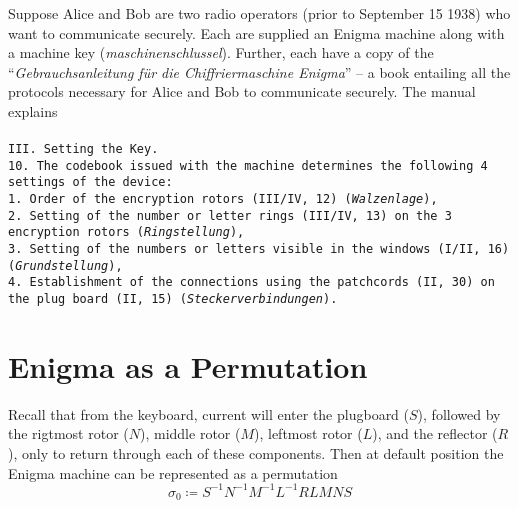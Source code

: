 Suppose Alice and Bob are two radio operators (prior to September 15 1938) who want to communicate securely. Each are
supplied an Enigma machine along with a machine key
(\emph{maschinenschlussel}).
Further, each have a copy of the ``\emph{Gebrauchsanleitung für die Chiffriermaschine Enigma}'' -- a book entailing all the protocols necessary for Alice
and Bob to communicate securely. The manual explains
\\\\\texttt{III. Setting the Key. }
\\\texttt{10. The codebook issued with the machine determines the following 4 settings of the device:}
\\\texttt{1. Order of the encryption rotors (III/IV, 12) (\emph{Walzenlage}),}
\\\texttt{2. Setting of the number or letter rings (III/IV, 13) on the 3 encryption rotors (\emph{Ringstellung}),}
\\\texttt{3. Setting of the numbers or letters visible in the windows (I/II, 16) (\emph{Grundstellung}),}
\\\texttt{4. Establishment of the connections using the patchcords (II, 30) on the plug board (II, 15) (\emph{Steckerverbindungen}).}




\section{Enigma as a Permutation}

Recall that from the keyboard, current will enter the plugboard ($S$), followed by the rigtmost rotor ($N$), middle
rotor ($M$), leftmost rotor ($L$), and the reflector ($R$), only to return through each of these components. Then at default position the Enigma machine can be represented as a permutation
\[
	\sigma_0 \coloneq S^{-1}N^{-1}M^{-1}L^{-1}RLMNS
\]


